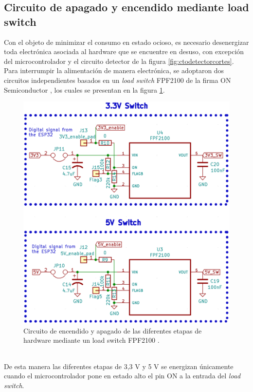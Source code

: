  \subsection{Circuito de apagado y encendido mediante load switch}
 Con el objeto de minimizar el consumo en estado ocioso, es necesario desenergizar toda electrónica asociada al hardware que se encuentre en desuso, con excepción del microcontrolador y el circuito detector de la figura \ref{fig:ctodetectorcortes}.\\
 Para interrumpir la alimentación de manera electrónica, se adoptaron dos circuitos independientes basados en un \textit{load switch} FPF2100 de la firma ON Semiconductor \citep{fpf2100}, los cuales se presentan en la figura \ref{fig:ctoloadswitch}.
 \begin{figure}[h]
 	\centering
 	\includegraphics[width=0.7\linewidth]{Figures/cto_load_switch}
 	\caption{Circuito de encendido y apagado de las diferentes etapas de hardware mediante un load switch FPF2100 \citep{fpf2100}.}
 	\label{fig:ctoloadswitch}
 \end{figure}\\
De esta manera las diferentes etapas de 3,3 V y 5 V se energizan únicamente cuando el microcontrolador pone en estado alto el pin ON a la entrada del \textit{load switch}.\\
 
